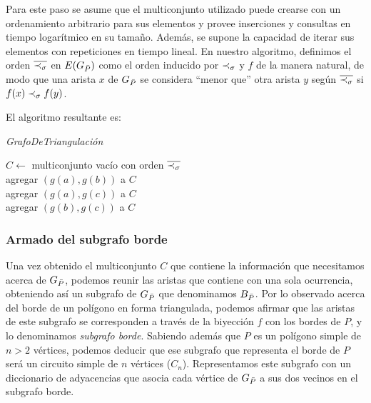 Para este paso se asume que el multiconjunto utilizado puede crearse con un ordenamiento arbitrario para sus elementos y provee inserciones y consultas en tiempo logarítmico en su tamaño. Además, se supone la capacidad de iterar sus elementos con repeticiones en tiempo lineal. En nuestro algoritmo, definimos el orden $\overline{\prec_{\sigma}}$ en $E(G_{\bar{P}})$ como el orden inducido por $\prec_{\sigma}$ y $f$ de la manera natural, de modo que una arista $x$ de $G_{\bar{P}}$ se considera ``menor que'' otra arista $y$ según $\overline{\prec_{\sigma}}$ si $f(x) \prec_{\sigma} f(y)$.

El algoritmo resultante es:

\bigskip

\begin{algorithm}[H]
	\caption{\textit{GrafoDeTriangulación}}

	$C \gets$ multiconjunto vacío con orden $\overline{\prec_{\sigma}}$\\
	
     {
	agregar $(g(a),g(b))$ a $C$ \\
	agregar $(g(a),g(c))$ a $C$ \\
	agregar $(g(b),g(c))$ a $C$ \\
}

\end{algorithm}

\bigskip

\subsubsection{Armado del subgrafo borde}

Una vez obtenido el multiconjunto $C$ que contiene la información que necesitamos acerca de $G_{\bar{P}}$, podemos reunir las aristas que contiene con una sola ocurrencia, obteniendo así un subgrafo de $G_{\bar{P}}$ que denominamos $B_{\bar{P}}$. Por lo observado acerca del borde de un polígono en forma triangulada, podemos afirmar que las aristas de este subgrafo se corresponden a través de la biyección $f$ con los bordes de $P$, y lo denominamos \textit{subgrafo borde}. Sabiendo además que $P$ es un polígono simple de $n > 2$ vértices, podemos deducir que ese subgrafo que representa el borde de $P$ será un circuito simple de $n$ vértices ($C_n$). Representamos este subgrafo con un diccionario de adyacencias que asocia cada vértice de $G_{\bar{P}}$ a sus dos vecinos en el subgrafo borde.

